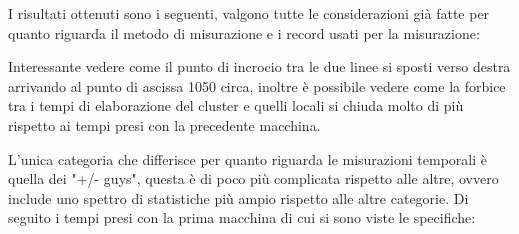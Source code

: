 \documentclass[10pt,a4paper,twocolumn]{article}
\begin{document}
I risultati ottenuti sono i seguenti, valgono tutte le considerazioni già fatte per quanto riguarda il metodo di misurazione e i record usati per la misurazione:


Interessante vedere come il punto di incrocio tra le due linee si sposti verso destra arrivando al punto di ascissa 1050 circa, inoltre è possibile vedere come la forbice tra i tempi di elaborazione del cluster e quelli locali si chiuda molto di più rispetto ai tempi presi con la precedente macchina.

L'unica categoria che differisce per quanto riguarda le misurazioni temporali è quella dei "+/- guys", questa è di poco più complicata rispetto alle altre, ovvero include uno spettro di statistiche più ampio rispetto alle altre categorie. Di seguito i tempi presi con la prima macchina di cui si sono viste le specifiche:
\end{document}
